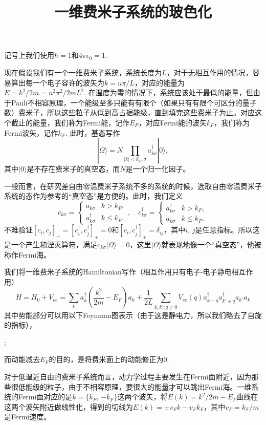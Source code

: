 \documentclass[9pt]{extarticle}
\title{一维费米子系统的玻色化}
\author{}
\begin{document}
\maketitle

记号上我们使用$\hbar=1$和$4\pi\epsilon_0=1$. 

现在假设我们有一个一维费米子系统，系统长度为$L$，对于无相互作用的情况，容易算出每一个电子容许的波矢为$k=n\pi/L$，对应的能量为$E=k^2/2m=n^2\pi^2/2mL^2$. 在温度为零的情况下，系统应该处于最低的能量，但由于Pauli不相容原理，一个能级至多只能有有限个（如果只有有限个可区分的量子数）费米子，所以这些粒子从低到高占据能级，直到填完这些费米子为止。对应这个截止的能量，我们称为Fermi能，记作$E_F$，对应Fermi能的波矢$k_F$，我们称为Fermi波矢，记作$k_F$. 此时，基态写作
\[
	|\Omega\rangle=N\prod_{|k|<k_F,\sigma} a^\dag_{k\sigma}|0\rangle,
\]
其中$|0\rangle$是不存在费米子的真空态，而$N$是一个归一化因子。

一般而言，在研究差自由零温费米子系统不多的系统的时候，选取自由零温费米子系统的态作为参考的“真空态”是方便的。此时，我们定义
\[
c_{k\sigma}=\begin{cases}
a_{k\sigma}&k>k_F,\\
a^\dag_{k\sigma}&k\leq k_F.
\end{cases},\quad
c^\dag_{k\sigma}=\begin{cases}
a^\dag_{k\sigma}&k>k_F,\\
a_{k\sigma}&k\leq k_F.
\end{cases}
\]
不难验证$[c_i,c_j]_+=[c^\dag_i,c^\dag_j]_+=0$和$[c_i,c^\dag_j]_+=\delta_{ij}$，其中$i$, $j$是任意指标。所以这是一个产生和湮灭算符，满足$c_{k\sigma}|\Omega\rangle=0$，这里$|\Omega\rangle$就表现地像一个“真空态”，他被称作Fermi海。%

我们将一维费米子系统的Hamiltonian写作（相互作用只有电子-电子静电相互作用）
\[
	H=H_0+V_{ee}=\sum_k a_k^\dag \left(\frac{k^2}{2m}-E_F\right)a_k+\frac{1}{2L}\sum_{k,k';q\neq 0}V_{ee}(q)a^\dag_{k-q}a^{\dag}_{k'+q}a_{k'}a_k
\]
其中势能部分可以用以下Feynman图表示（由于这是静电力，所以我们略去了自旋的指标），
\begin{center}
;
\end{center}
而动能减去$E_F$的目的，是将费米面上的动能修正为$0$.

对于低温近自由的费米子系统而言，动力学过程主要发生在Fermi面附近，因为那些很低能级的粒子，由于不相容原理，要很大的能量才可以跳出Fermi海。一维系统的Fermi面对应的是$k=\{k_F$, $-k_F\}$这两个波矢，将$E(k)=k^2/2m-E_F$曲线在这两个波矢附近做线性化，得到的切线为$E(k)=\pm v_Fk-v_Fk_F$，其中$v_F=k_F/m$是Fermi速度。
\end{document}
